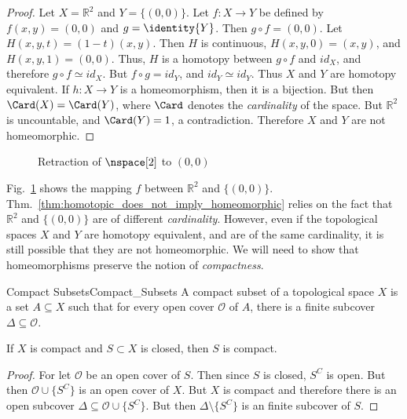 \documentclass{article}                                                        %
\begin{document}
        \begin{proof}
            Let $X=\mathbb{R}^{2}$ and $Y=\{(0,0)\}$. Let $f:{X}\rightarrow{Y}$
            be defined by $f(x,y)=(0,0)$ and $g=\identity{Y}$. Then
            $g\circ{f}=(0,0)$. Let $H(x,y,t)=(1-t)(x,y)$.
            Then $H$ is continuous, $H(x,y,0)=(x,y)$,
            and $H(x,y,1)=(0,0)$. Thus, $H$ is a
            homotopy between ${g}\circ{f}$ and $id_{X}$, and
            therefore ${g}\circ{f}\simeq{id_{X}}$. But
            ${f}\circ{g}=id_{Y}$, and ${id_{Y}}\simeq{id_{Y}}$.
            Thus $X$ and $Y$ are homotopy equivalent.
            If $h:{X}\rightarrow{Y}$ is a homeomorphism, then it is a
            bijection. But then $\Card(X)=\Card(Y)$,
            where $\Card$ denotes the \textit{cardinality} of the space.
            But $\mathbb{R}^{2}$ is uncountable, and $\Card(Y)=1$,
            a contradiction. Therefore $X$ and $Y$ are not homeomorphic.
        \end{proof}
        \begin{figure}[H]
            \captionsetup{type=figure}
            \centering
            
            \caption{Retraction of $\nspace[2]$ to $(0,0)$}
            \label{fig:homotopy_equivalence_of_plane_with_point}
        \end{figure}
        Fig.~\ref{fig:homotopy_equivalence_of_plane_with_point}
        shows the mapping $f$ between $\mathbb{R}^{2}$ and $\{(0,0)\}$.
        Thm.~\ref{thm:homotopic_does_not_imply_homeomorphic} relies on the
        fact that $\mathbb{R}^{2}$ and $\{(0,0)\}$ are of different
        \textit{cardinality}. However, even if the topological spaces $X$
        and $Y$ are homotopy equivalent, and are of the same cardinality,
        it is still possible that they are not homeomorphic. We will need
        to show that homeomorphisms preserve the notion of \textit{compactness}.
        \begin{ldefinition}{Compact Subsets}{Compact_Subsets}
            A compact subset of a topological space $X$ is a set $A\subseteq{X}$
            such that for every open cover $\mathcal{O}$ of $A$, there is a
            finite subcover $\Delta\subseteq\mathcal{O}$.
        \end{ldefinition}
        \begin{theorem}
            If $X$ is compact and $S\subset{X}$ is closed, then $S$ is compact.
        \end{theorem}
        \begin{proof}
            For let $\mathcal{O}$ be an open cover of $S$. Then since $S$ is
            closed, $S^{C}$ is open. But then $\mathcal{O}\cup\{S^{C}\}$ is
            an open cover of $X$. But $X$ is compact and therefore there is
            an open subcover $\Delta\subseteq\mathcal{O}\cup\{S^{C}\}$. But
            then $\Delta\setminus\{S^{C}\}$ is an finite subcover of $S$.
        \end{proof}
\end{document}

